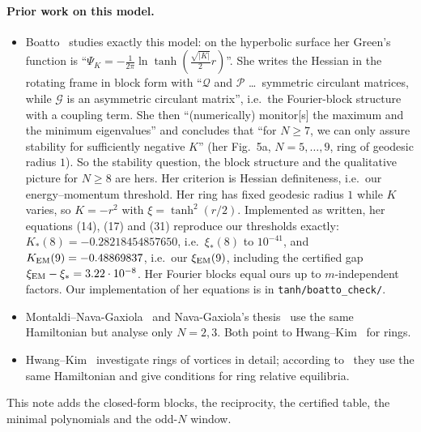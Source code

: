\documentclass[11pt]{article}
\theoremstyle{remark}
\begin{document}
\paragraph{Prior work on this model.}
\begin{itemize}
\item Boatto~\cite{Boatto} studies exactly this model: on the hyperbolic surface her Green's function is
``$\Psi_K=-\frac1{2\pi}\ln\tanh(\frac{\sqrt{|K|}}2r)$''. She writes the Hessian in the rotating frame in block form with
``$\mathcal Q$ and $\mathcal P$ \dots\ symmetric circulant matrices, while $\mathcal G$ is an asymmetric circulant
matrix'', i.e.\ the Fourier-block structure with a coupling term. She then ``(numerically) monitor[s] the maximum and
the minimum eigenvalues'' and concludes that ``for $N\ge7$, we can only assure stability for sufficiently negative
$K$'' (her Fig.~5a, $N=5,\dots,9$, ring of geodesic radius $1$). So the stability question, the block structure and the
qualitative picture for $N\ge8$ are hers. Her criterion is Hessian definiteness, i.e.\ our energy--momentum threshold. Her ring has fixed
geodesic radius $1$ while $K$ varies, so $K=-r^2$ with $\xi=\tanh^2(r/2)$. Implemented as written, her equations
(14), (17) and (31) reproduce our thresholds exactly: $K_*(8)=-0.28218454857650$, i.e.\ $\xi_*(8)$ to $10^{-41}$, and
$K_{\rm EM}(9)=-0.48869837$, i.e.\ our $\xi_{\rm EM}(9)$, including the certified gap $\xi_{\rm EM}-\xi_*=3.22\cdot10^{-8}$.
Her Fourier blocks equal ours up to $m$-independent factors. Our implementation of her equations is in
\texttt{tanh/boatto\_check/}.
\item Montaldi--Nava-Gaxiola~\cite{MNG} and Nava-Gaxiola's thesis~\cite{NG} use the same Hamiltonian but analyse only
$N=2,3$. Both point to Hwang--Kim~\cite{HK} for rings.
\item Hwang--Kim~\cite{HK} investigate rings of vortices in detail; according to~\cite{NG} they use the same
Hamiltonian and give conditions for ring relative equilibria.
\end{itemize}
This note adds the closed-form blocks, the reciprocity, the certified table, the minimal polynomials and the odd-$N$
window.
\end{document}
